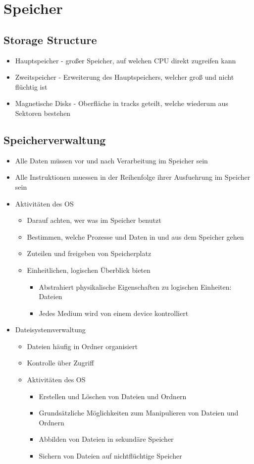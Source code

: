 \documentclass[a4paper]{scrreprt}
\begin{document}
\section{Speicher}
\subsection{Storage Structure}
\begin{itemize}
	\item Hauptspeicher - großer Speicher, auf welchen CPU direkt zugreifen kann
	\item Zweitspeicher - Erweiterung des Hauptspeichers, welcher groß und nicht flüchtig ist
	\item Magnetische Disks - Oberfläche in tracks geteilt, welche wiederum aus Sektoren bestehen
\end{itemize}

\subsection{Speicherverwaltung}
\begin{itemize}
	\item Alle Daten müssen vor und nach Verarbeitung im Speicher sein
	\item Alle Instruktionen muessen in der Reihenfolge ihrer Ausfuehrung im Speicher sein
	\item Aktivitäten des OS
		\begin{itemize}
			\item Darauf achten, wer was im Speicher benutzt
			\item Bestimmen, welche Prozesse und Daten in und aus dem Speicher gehen
			\item Zuteilen und freigeben von Speicherplatz
			\item Einheitlichen, logischen Überblick bieten
				\begin{itemize}
					\item Abstrahiert physikalische Eigenschaften zu logischen Einheiten: Dateien
					\item Jedes Medium wird von einem device kontrolliert
				\end{itemize}
		\end{itemize}
	\item Dateisystemverwaltung
		\begin{itemize}
			\item Dateien häufig in Ordner organisiert
			\item Kontrolle über Zugriff
			\item Aktivitäten des OS
				\begin{itemize}
					\item Erstellen und Löschen von Dateien und Ordnern
					\item Grundsätzliche Möglichkeiten zum Manipulieren von Dateien und Ordnern
					\item Abbilden von Dateien in sekundäre Speicher
					\item Sichern von Dateien auf nichtflüchtige Speicher
				\end{itemize}
		\end{itemize}
\end{itemize}
\end{document}
